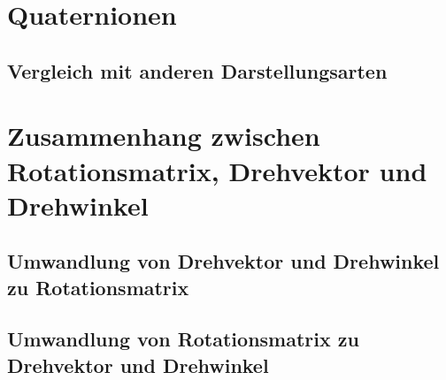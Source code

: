 \chapter{Quaternionen} %
	\section{Vergleich mit anderen Darstellungsarten} %

\chapter{Zusammenhang zwischen Rotationsmatrix, Drehvektor und Drehwinkel} %

	\section{Umwandlung von Drehvektor und Drehwinkel zu Rotationsmatrix} %

	\section{Umwandlung von Rotationsmatrix zu Drehvektor und Drehwinkel} %
